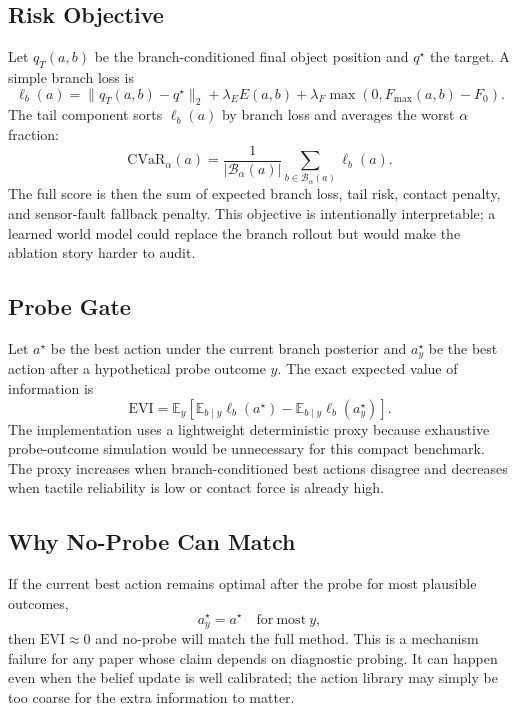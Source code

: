 \documentclass{article}
\newcommand{\act}{a}
\newcommand{\branchset}{\mathcal{B}}
\begin{document}
\subsection{Risk Objective}

Let $q_T(\act,b)$ be the branch-conditioned final object position and $q^\star$ the target. A simple branch loss is
\begin{equation}
  \ell_b(\act)=
  \|q_T(\act,b)-q^\star\|_2
  +\lambda_E E(\act,b)
  +\lambda_F \max(0,F_{\max}(\act,b)-F_0).
\end{equation}
The tail component sorts $\ell_b(\act)$ by branch loss and averages the worst $\alpha$ fraction:
\begin{equation}
  \mathrm{CVaR}_{\alpha}(\act)=
  \frac{1}{|\branchset_\alpha(\act)|}
  \sum_{b\in\branchset_\alpha(\act)}\ell_b(\act).
\end{equation}
The full score is then the sum of expected branch loss, tail risk, contact penalty, and sensor-fault fallback penalty. This objective is intentionally interpretable; a learned world model could replace the branch rollout but would make the ablation story harder to audit.

\subsection{Probe Gate}

Let $\act^\star$ be the best action under the current branch posterior and $\act^\star_y$ be the best action after a hypothetical probe outcome $y$. The exact expected value of information is
\begin{equation}
  \mathrm{EVI} =
  \mathbb{E}_{y}\left[
    \mathbb{E}_{b\mid y}\ell_b(\act^\star)
    -
    \mathbb{E}_{b\mid y}\ell_b(\act^\star_y)
  \right].
\end{equation}
The implementation uses a lightweight deterministic proxy because exhaustive probe-outcome simulation would be unnecessary for this compact benchmark. The proxy increases when branch-conditioned best actions disagree and decreases when tactile reliability is low or contact force is already high.

\subsection{Why No-Probe Can Match}

If the current best action remains optimal after the probe for most plausible outcomes,
\begin{equation}
  \act^\star_y=\act^\star\quad \mathrm{for\ most}\ y,
\end{equation}
then $\mathrm{EVI}\approx 0$ and no-probe will match the full method. This is a mechanism failure for any paper whose claim depends on diagnostic probing. It can happen even when the belief update is well calibrated; the action library may simply be too coarse for the extra information to matter.
\end{document}
